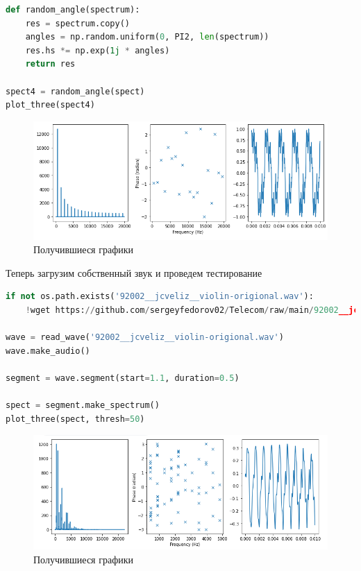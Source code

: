 \begin{lstlisting}[language=Python]
def random_angle(spectrum):
    res = spectrum.copy()
    angles = np.random.uniform(0, PI2, len(spectrum))
    res.hs *= np.exp(1j * angles)
    return res
    
spect4 = random_angle(spect)
plot_three(spect4)
\end{lstlisting}

\begin{figure}[H]
	\begin{center}
		\includegraphics[scale=0.66]{fig/lab06/lab06_14.png}
		\caption{Получившиеся графики}
	\end{center}
\end{figure}

Теперь загрузим собственный звук и проведем тестирование

\begin{lstlisting}[language=Python]
if not os.path.exists('92002__jcveliz__violin-origional.wav'):
    !wget https://github.com/sergeyfedorov02/Telecom/raw/main/92002__jcveliz__violin-origional.wav
    
wave = read_wave('92002__jcveliz__violin-origional.wav')
wave.make_audio()

segment = wave.segment(start=1.1, duration=0.5)

spect = segment.make_spectrum()
plot_three(spect, thresh=50)
\end{lstlisting}

\begin{figure}[H]
	\begin{center}
		\includegraphics[scale=0.66]{fig/lab06/lab06_15.png}
		\caption{Получившиеся графики}
	\end{center}
\end{figure}

